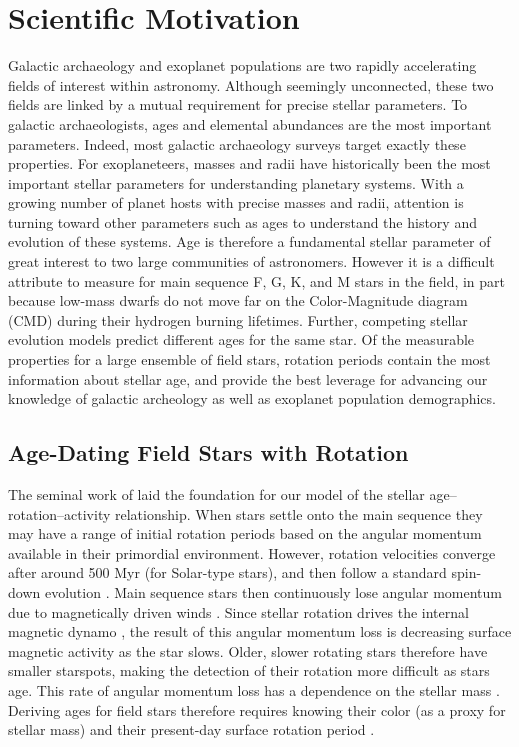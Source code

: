 \documentclass[12pt]{article}
\begin{document}
\section{Scientific Motivation}
Galactic archaeology and exoplanet populations are two rapidly accelerating
fields of interest within astronomy.
Although seemingly unconnected, these two fields are linked by a mutual
requirement for precise stellar parameters.
To galactic archaeologists, ages and elemental abundances are the most
important parameters.
Indeed, most galactic archaeology surveys target exactly these properties.
For exoplaneteers, masses and radii have historically been the most important
stellar parameters for understanding planetary systems.
With a growing number of planet hosts with precise masses and radii, attention
is turning toward other parameters such as ages to understand the history and
evolution of these systems.
Age is therefore a fundamental stellar parameter of great interest to two
large communities of astronomers.
However it is a difficult attribute to measure for main sequence F, G, K, and
M stars in the field, in part because low-mass dwarfs do not move far on the
Color-Magnitude diagram (CMD) during their hydrogen burning lifetimes.
Further, competing stellar evolution models predict different ages for the
same star.
Of the measurable properties for a large ensemble of field stars, rotation
periods contain the most information about stellar age, and provide the best
leverage for advancing our knowledge of galactic archeology as well as
exoplanet population demographics.


\subsection{Age-Dating Field Stars with Rotation}
The seminal work of \citet{skumanich1972} laid the foundation for our model of
the stellar age--rotation--activity relationship.
When stars settle onto the main sequence they may have a range of initial
rotation periods based on the angular momentum available in their primordial
environment.
However, rotation velocities converge after around 500 Myr \citep{Radick1987,
Irwin2009} (for Solar-type stars), and then follow a standard spin-down
evolution \citep{barnes2010}.
Main sequence stars then continuously lose angular momentum due to
magnetically driven winds \citep{Schatzman1962, Weber1967, Mestel1984,
Kawaler1988, Charbonneau2010}.
Since stellar rotation drives the internal magnetic dynamo
\citep[][]{Schatzman1962, Parker1970}, the result of this angular momentum
loss is decreasing surface magnetic activity as the star slows.
Older, slower rotating stars therefore have smaller starspots, making the
detection of their rotation more difficult as stars age.
This rate of angular momentum loss has a dependence on the stellar mass
\citep{Noyes1984}.
Deriving ages for field stars therefore requires knowing their color (as a
proxy for stellar mass) and their present-day surface rotation period
\citep{barnes2007}.
\end{document}

